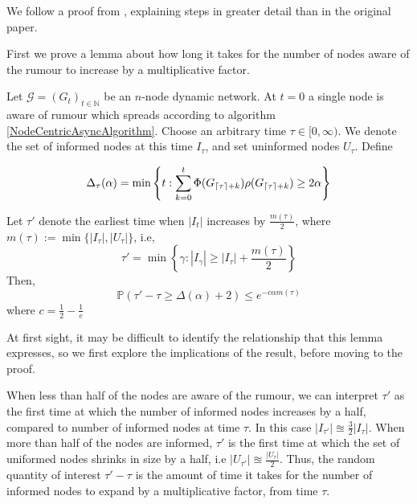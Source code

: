 We follow a proof from \cite{asyncPaper}, explaining steps in greater detail than in the original paper.

First we prove a lemma about how long it takes for the number of nodes aware of the rumour to increase by a multiplicative factor. 

\begin{lemma} \label{AsyncIncreaseLemma}
	Let $\mathcal{G}=(G_t)_{t \in \mathbb{N}}$ be an $n$-node dynamic network. At $t=0$ a single node is aware of rumour which spreads according to algorithm \ref{NodeCentricAsyncAlgorithm}. Choose an arbitrary time $\tau \in [0, \infty)$. We denote the set of informed nodes at this time $I_\tau$, and set uninformed nodes $U_\tau$.
	\noindent
	Define 
	
	$$
	\Delta_\tau(\alpha) = \min \left\{t: \sum_{k=0}^t \Phi(G_{\lceil\tau\rceil+k})\rho(G_{\lceil\tau\rceil+k}) \geq 2 \alpha \right\}
	$$

	\noindent
	Let $\tau'$ denote the earliest time when $|I_t|$ increases by $\frac{m(\tau)}{2}$, where $m(\tau) := \min\{|I_\tau|, |U_\tau|\}$, i.e,
	$$
		\tau' = \min\left\{\gamma : |I_{\gamma}| \geq |I_\tau| + \frac{m(\tau)}{2}\right\}
	$$
	\noindent
	Then, 
	$$
		\mathbb{P}(\tau' - \tau \geq \Delta(\alpha) + 2) \leq e^{-c\alpha m(\tau)}
	$$
	\noindent
	where $c = \frac{1}{2} - \frac{1}{e}$
\end{lemma}


At first sight, it may be difficult to identify the relationship that this lemma expresses, so we first explore the implications of the result, before moving to the proof.

When less than half of the nodes are aware of the rumour, we can interpret $\tau'$ as the first time at which the number of informed nodes increases by a half, compared to number of informed nodes at time $\tau$. In this case $|I_{\tau'}| \approxeq \frac{3}{2} |I_\tau|$. When more than half of the nodes are informed, $\tau'$ is the first time at which the set of uniformed nodes shrinks in size by a half, i.e $|U_{\tau'}| \approxeq \frac{|U_\tau|}{2}$. Thus, the random quantity of interest $\tau'-\tau$ is the amount of time it takes for the number of informed nodes to expand by a multiplicative factor, from time $\tau$. 

